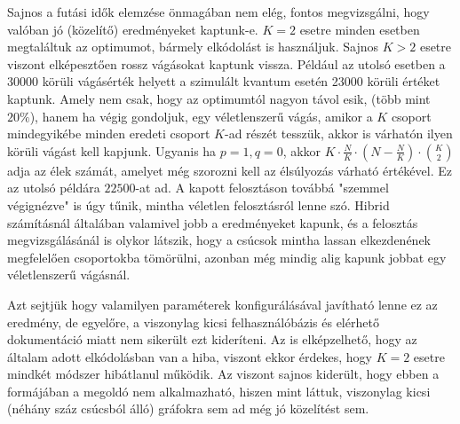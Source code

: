 Sajnos a futási idők elemzése önmagában nem elég, fontos megvizsgálni, hogy valóban jó (közelítő) eredményeket kaptunk-e. $K=2$ esetre minden esetben megtaláltuk az optimumot, bármely elkódolást is használjuk.
Sajnos $K>2$ esetre viszont elképesztően rossz vágásokat kaptunk vissza. Például az utolsó esetben a 30000 körüli vágásérték helyett a szimulált kvantum esetén 23000 körüli értéket kaptunk. Amely nem csak, hogy az optimumtól nagyon távol esik, (több mint $20\%$), hanem ha végig gondoljuk, egy véletlenszerű vágás, amikor a $K$ csoport mindegyikébe minden eredeti csoport $K$-ad részét tesszük, akkor is várhatón ilyen körüli vágást kell kapjunk. Ugyanis ha $p=1, q=0$, akkor $K \cdot \frac{N}{K} \cdot (N-\frac{N}{K}) \cdot \binom{K}{2}$ adja az élek számát, amelyet még szorozni kell az élsúlyozás várható értékével. Ez az utolsó példára $22500$-at ad. A kapott felosztáson továbbá "szemmel végignézve" is úgy tűnik, mintha véletlen felosztásról lenne szó.
Hibrid számításnál általában valamivel jobb a eredményeket kapunk, és a felosztás megvizsgálásánál is olykor látszik, hogy a csúcsok mintha lassan elkezdenének megfelelően csoportokba tömörülni, azonban még mindig alig kapunk jobbat egy véletlenszerű vágásnál.

Azt sejtjük hogy valamilyen paraméterek konfigurálásával javítható lenne ez az eredmény, de egyelőre, a viszonylag kicsi felhasználóbázis és elérhető dokumentáció miatt nem sikerült ezt kideríteni. Az is elképzelhető, hogy az általam adott elkódolásban van a hiba, viszont ekkor érdekes, hogy $K=2$ esetre mindkét módszer hibátlanul működik.  Az viszont sajnos kiderült, hogy ebben a formájában a megoldó nem alkalmazható, hiszen mint láttuk, viszonylag kicsi (néhány száz csúcsból álló) gráfokra sem ad még jó közelítést sem.


